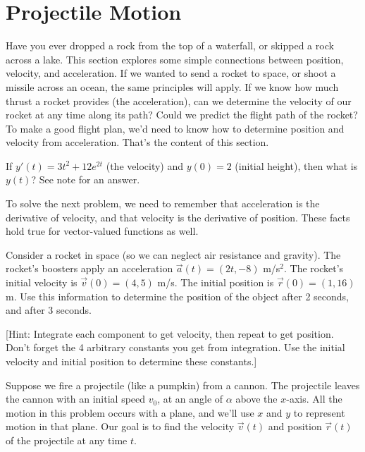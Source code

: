 \section{Projectile Motion}

Have you ever dropped a rock from the top of a waterfall, or skipped a rock across a lake. This section explores some simple connections between position, velocity, and acceleration. If we wanted to send a rocket to space, or shoot a missile across an ocean, the same principles will apply. If we know how much thrust a rocket provides (the acceleration), can we determine the velocity of our rocket at any time along its path?  Could we predict the flight path of the rocket? To make a good flight plan, we'd need to know how to determine position and velocity from acceleration.  That's the content of this section.  

\begin{review*}
 If $y'(t) = 3t^2+12e^{2t}$ (the velocity) and $y(0)=2$ (initial height), then what is $y(t)$? See note  for an answer.
\end{review*}


To solve the next problem, we need to remember that acceleration is the derivative of velocity, and that velocity is the derivative of position.  These facts hold true for vector-valued functions as well.


\begin{problem}
Consider a rocket in space (so we can neglect air resistance and gravity). The rocket's boosters apply an acceleration $\vec a(t) = (2t,-8)$ m/s$^2$. The rocket's initial velocity is $\vec v(0) = (4,5)$ m/s.  The initial position is $\vec r(0) = (1,16)$ m. Use this information to determine the position of the object after 2 seconds, and after 3 seconds. 

[Hint: Integrate each component to get velocity, then repeat to get position. Don't forget the 4 arbitrary constants you get from integration. Use the initial velocity and initial position to determine these constants.]
\end{problem}

Suppose we fire a projectile (like a pumpkin) from a cannon. The projectile leaves the cannon with an initial speed $v_0$, at an angle of $\alpha$ above the $x$-axis. All the motion in this problem occurs with a plane, and we'll use $x$ and $y$ to represent motion in that plane. Our goal is to find the velocity $\vec v(t)$ and position $\vec r(t)$  of the projectile at any time $t$. 

